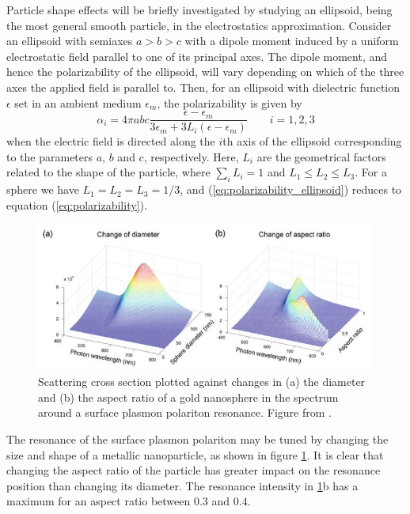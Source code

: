 Particle shape effects will be briefly investigated by studying an ellipsoid, being the most general smooth particle, in the electrostatics approximation. Consider an ellipsoid with semiaxes $a>b>c$ with a dipole moment induced by a uniform electrostatic field parallel to one of its principal axes. The dipole moment, and hence the polarizability of the ellipsoid, will vary depending on which of the three axes the applied field is parallel to. Then, for an ellipsoid with dielectric function $\epsilon$ set in an ambient medium $\epsilon_m$, the polarizability is given by \cite{BH}
\begin{equation}
    \alpha_i = 4\pi abc \frac{\epsilon-\epsilon_m}{3\epsilon_m + 3L_i(\epsilon-\epsilon_m)} \quad\quad i=1,2,3
    \label{eq:polarizability_ellipsoid}
\end{equation}
when the electric field is directed along the $i$th axis of the ellipsoid corresponding to the parameters $a$, $b$ and $c$, respectively. Here, $L_i$ are the geometrical factors related to the shape of the particle, where $\sum_i L_i=1$ and $L_1\leq L_2 \leq L_3$. For a sphere we have $L_1=L_2=L_3=1/3$, and (\ref{eq:polarizability_ellipsoid}) reduces to equation (\ref{eq:polarizability}).

\begin{figure}[h]
    \centering
    \includegraphics[width=\linewidth]{figures/Ch2/TuningLSPR.png}
    \caption{Scattering cross section plotted against changes in (a) the diameter and (b) the aspect ratio of a gold nanosphere in the spectrum around a surface plasmon polariton resonance. Figure from \cite{Trugler_metallicnanoparticles}.}
    \label{fig:tuning_plasmon_resonance}
\end{figure}

The resonance of the surface plasmon polariton may be tuned by changing the size and shape of a metallic nanoparticle, as shown in figure \ref{fig:tuning_plasmon_resonance}. It is clear that changing the aspect ratio of the particle has greater impact on the resonance position than changing its diameter. The resonance intensity in \ref{fig:tuning_plasmon_resonance}b has a maximum for an aspect ratio between $0.3$ and $0.4$\cite{Trugler_metallicnanoparticles}\cite{Becker_aspectratio_goldnanorods}.

